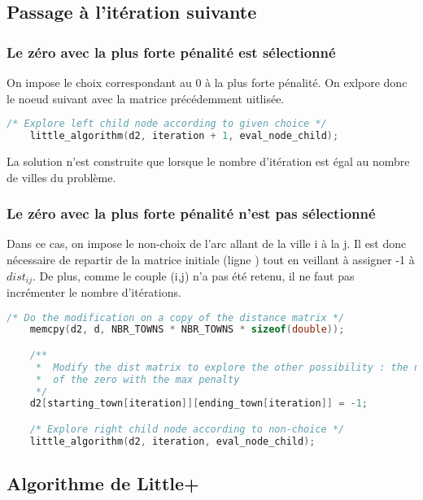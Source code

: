 \documentclass[a4paper]{article}
\begin{document}
\subsection{Passage à l'itération suivante}

\subsubsection{Le zéro avec la plus forte pénalité est sélectionné}

On impose le choix correspondant au 0 à la plus forte pénalité. On exlpore donc le noeud suivant avec la matrice précédemment uitlisée.

\begin{lstlisting}[language=C]
    /* Explore left child node according to given choice */
    little_algorithm(d2, iteration + 1, eval_node_child);
\end{lstlisting}

La solution n'est construite que lorsque le nombre d'itération est égal au nombre de villes du problème.

\subsubsection{Le zéro avec la plus forte pénalité n'est pas sélectionné}

Dans ce cas, on impose le non-choix de l'arc allant de la ville i à la j. Il est donc nécessaire de repartir de la matrice initiale (ligne ) tout en veillant à assigner -1 à $dist_{ij}$. De plus, comme le couple (i,j) n'a pas été retenu, il ne faut pas incrémenter le nombre d'itérations.

\begin{lstlisting}[language=C]
    /* Do the modification on a copy of the distance matrix */
    memcpy(d2, d, NBR_TOWNS * NBR_TOWNS * sizeof(double));

    /**
     *  Modify the dist matrix to explore the other possibility : the non-choice
     *  of the zero with the max penalty
     */
    d2[starting_town[iteration]][ending_town[iteration]] = -1;

    /* Explore right child node according to non-choice */
    little_algorithm(d2, iteration, eval_node_child);
\end{lstlisting}

\subsection{Algorithme de Little+}
\end{document}

